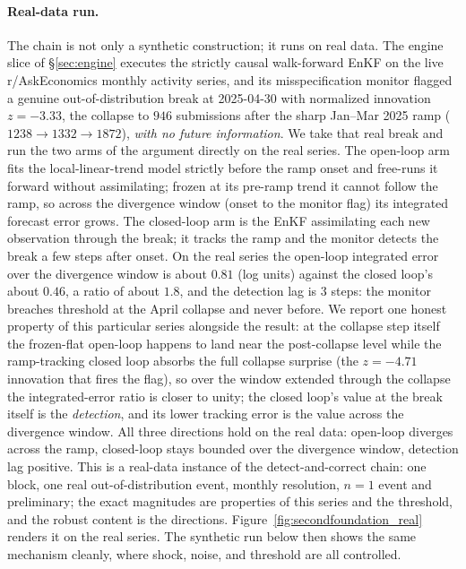 \documentclass[11pt]{article}
\begin{document}
\paragraph{Real-data run.} The chain is not only a synthetic construction; it runs on real data. The engine slice of \S\ref{sec:engine} executes the strictly causal walk-forward EnKF on the live r/AskEconomics monthly activity series, and its misspecification monitor flagged a genuine out-of-distribution break at 2025-04-30 with normalized innovation $z=-3.33$, the collapse to $946$ submissions after the sharp Jan--Mar 2025 ramp ($1238\to1332\to1872$), \emph{with no future information}. We take that real break and run the two arms of the argument directly on the real series. The open-loop arm fits the local-linear-trend model strictly before the ramp onset and free-runs it forward without assimilating; frozen at its pre-ramp trend it cannot follow the ramp, so across the divergence window (onset to the monitor flag) its integrated forecast error grows. The closed-loop arm is the EnKF assimilating each new observation through the break; it tracks the ramp and the monitor detects the break a few steps after onset. On the real series the open-loop integrated error over the divergence window is about $0.81$ (log units) against the closed loop's about $0.46$, a ratio of about $1.8$, and the detection lag is $3$ steps: the monitor breaches threshold at the April collapse and never before. We report one honest property of this particular series alongside the result: at the collapse step itself the frozen-flat open-loop happens to land near the post-collapse level while the ramp-tracking closed loop absorbs the full collapse surprise (the $z=-4.71$ innovation that fires the flag), so over the window extended through the collapse the integrated-error ratio is closer to unity; the closed loop's value at the break itself is the \emph{detection}, and its lower tracking error is the value across the divergence window. All three directions hold on the real data: open-loop diverges across the ramp, closed-loop stays bounded over the divergence window, detection lag positive. This is a real-data instance of the detect-and-correct chain: one block, one real out-of-distribution event, monthly resolution, $n=1$ event and preliminary; the exact magnitudes are properties of this series and the threshold, and the robust content is the directions. Figure~\ref{fig:secondfoundation_real} renders it on the real series. The synthetic run below then shows the same mechanism cleanly, where shock, noise, and threshold are all controlled.
\end{document}
